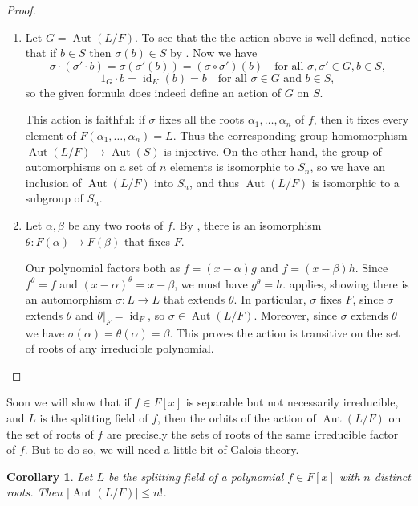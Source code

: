 \documentclass[12pt]{report}
\newtheorem{corollary}[theorem]{Corollary}
\numberwithin{equation}{section}
\numberwithin{theorem}{chapter}
\theoremstyle{definition}
\newtheorem*{basic properties}{Basic Properties}
\newtheorem*{Important Remark}{Important Remark}
\DeclareMathOperator{\id}{id}
\DeclareMathOperator{\Aut}{Aut}
\begin{document}
\begin{proof}$\,$
\begin{enumerate}[label=\alph*),leftmargin=15pt]
\item Let $G=\Aut(L/F)$. To see that the the action above is well-defined, notice that if $b\in S$ then $\sigma(b)\in S$ by . Now we have
$$\sigma \cdot (\sigma'\cdot b) = \sigma(\sigma' (b)) = (\sigma\circ\sigma')(b) \quad \textrm{for all } \sigma,\sigma' \in G, b\in S,$$
$$1_G\cdot b=\id_K(b)=b \quad  \textrm{for all } \sigma \in G \textrm{ and } b\in S,$$
so the given formula does indeed define an action of $G$ on $S$.

This action is faithful: if $\sigma$ fixes all the roots $\alpha_1, \dots, \alpha_n$ of $f$, then it fixes every element of $F(\alpha_1, \dots, \alpha_n) = L$. Thus the corresponding group homomorphism $\Aut(L/F) \to \Aut(S)$ is injective. On the other hand, the group of automorphisms on a set of $n$ elements is isomorphic to $S_n$, so we have an inclusion of $\Aut(L/F)$ into $S_n$, and thus $\Aut(L/F)$ is isomorphic to a subgroup of $S_n$.

\item Let $\alpha, \beta$ be any two roots of $f$. By , there is an isomorphism $\theta\!: F(\alpha) \to F(\beta)$ that fixes $F$. 

Our polynomial factors both as $f = (x-\alpha)g$ and $f = (x-\beta) h$. Since $f^\theta = f$ and $(x-\alpha)^\theta = x -\beta$, we must have $g^\theta = h$.  applies, showing there is an automorphism
$\sigma: L \to L$ that extends $\theta$. In particular, $\sigma$ fixes $F$, since $\sigma$ extends $\theta$ and $\theta|_F = \id_F$, so $\sigma \in \Aut(L/F)$. Moreover, since $\sigma$ extends $\theta$ we have $\sigma(\alpha) = \theta(\alpha) = \beta$. This proves the action is transitive on the set of roots of any irreducible polynomial.\qedhere
\end{enumerate}
\end{proof}



Soon we will show that if $f \in F[x]$ is separable but not necessarily irreducible, and $L$ is the splitting field of $f$, then the orbits of the action of $\Aut(L/F)$ on the set of roots of $f$ are precisely the sets of roots of the same irreducible factor of $f$. But to do so, we will need a little bit of Galois theory.

\begin{corollary}
Let $L$ be the splitting field of a polynomial $f \in F[x]$ with $n$ distinct roots. Then $|\Aut(L/F)| \leqslant n!$.
\end{corollary}
\end{document}
